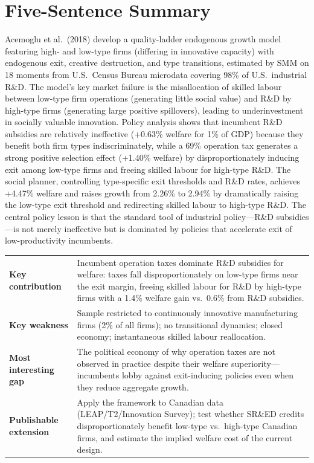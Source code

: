\section*{Five-Sentence Summary}

Acemoglu et al.\ (2018) develop a quality-ladder endogenous growth model
featuring high- and low-type firms (differing in innovative capacity) with
endogenous exit, creative destruction, and type transitions, estimated by SMM
on 18 moments from U.S.\ Census Bureau microdata covering 98\% of U.S.\
industrial R\&D. The model's key market failure is the misallocation of skilled
labour between low-type firm operations (generating little social value) and
R\&D by high-type firms (generating large positive spillovers), leading to
underinvestment in socially valuable innovation. Policy analysis shows that
incumbent R\&D subsidies are relatively ineffective (+0.63\% welfare for 1\%
of GDP) because they benefit both firm types indiscriminately, while a 69\%
operation tax generates a strong positive selection effect (+1.40\% welfare)
by disproportionately inducing exit among low-type firms and freeing skilled
labour for high-type R\&D. The social planner, controlling type-specific exit
thresholds and R\&D rates, achieves +4.47\% welfare and raises growth from
2.26\% to 2.94\% by dramatically raising the low-type exit threshold and
redirecting skilled labour to high-type R\&D. The central policy lesson is that
the standard tool of industrial policy---R\&D subsidies---is not merely
ineffective but is dominated by policies that accelerate exit of
low-productivity incumbents.

\vspace{6pt}
\begin{quickref}
\begin{tabularx}{\linewidth}{@{}lX@{}}
\textbf{Key contribution} &
  Incumbent operation taxes dominate R\&D subsidies for welfare: taxes fall
  disproportionately on low-type firms near the exit margin, freeing skilled
  labour for R\&D by high-type firms with a 1.4\% welfare gain vs.\ 0.6\%
  from R\&D subsidies. \\[4pt]
\textbf{Key weakness} &
  Sample restricted to continuously innovative manufacturing firms (2\% of
  all firms); no transitional dynamics; closed economy; instantaneous skilled
  labour reallocation. \\[4pt]
\textbf{Most interesting gap} &
  The political economy of why operation taxes are not observed in practice
  despite their welfare superiority---incumbents lobby against exit-inducing
  policies even when they reduce aggregate growth. \\[4pt]
\textbf{Publishable extension} &
  Apply the framework to Canadian data (LEAP/T2/Innovation Survey); test
  whether SR\&ED credits disproportionately benefit low-type vs.\ high-type
  Canadian firms, and estimate the implied welfare cost of the current design.
\end{tabularx}
\end{quickref}
